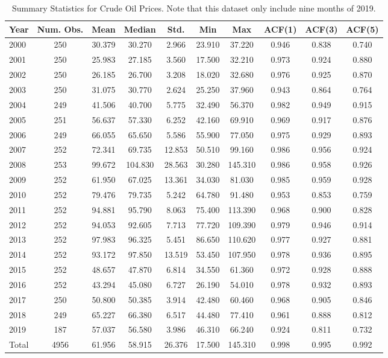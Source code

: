 \documentclass[12pt]{article}
\begin{document}
	\begin{table}[H]
		\small
		\centering
		\begin{tabular}{l|c c c c c c c c c}
			\toprule
			Year & Num. Obs. & Mean & Median & Std. & Min & Max & ACF(1) & ACF(3) & ACF(5) \\
			\midrule
			2000 & 250 & 30.379 & 30.270 & 2.966 & 23.910 & 37.220 & 0.946 & 0.838 & 0.740 \\
			2001 & 250 & 25.983 & 27.185 & 3.560 & 17.500 & 32.210 & 0.973 & 0.924 & 0.880 \\
			2002 & 250 & 26.185 & 26.700 & 3.208 & 18.020 & 32.680 & 0.976 & 0.925 & 0.870 \\
			2003 & 250 & 31.075 & 30.770 & 2.624 & 25.250 & 37.960 & 0.943 & 0.864 & 0.764 \\
			2004 & 249 & 41.506 & 40.700 & 5.775 & 32.490 & 56.370 & 0.982 & 0.949 & 0.915 \\
			2005 & 251 & 56.637 & 57.330 & 6.252 & 42.160 & 69.910 & 0.969 & 0.917 & 0.876 \\
			2006 & 249 & 66.055 & 65.650 & 5.586 & 55.900 & 77.050 & 0.975 & 0.929 & 0.893 \\
			2007 & 252 & 72.341 & 69.735 & 12.853 & 50.510 & 99.160 & 0.986 & 0.956 & 0.924 \\
			2008 & 253 & 99.672 & 104.830 & 28.563 & 30.280 & 145.310 & 0.986 & 0.958 & 0.926 \\
			2009 & 252 & 61.950 & 67.025 & 13.361 & 34.030 & 81.030 & 0.985 & 0.959 & 0.928 \\
			2010 & 252 & 79.476 & 79.735 & 5.242 & 64.780 & 91.480 & 0.953 & 0.853 & 0.759 \\
			2011 & 252 & 94.881 & 95.790 & 8.063 & 75.400 & 113.390 & 0.968 & 0.900 & 0.828 \\
			2012 & 252 & 94.053 & 92.605 & 7.713 & 77.720 & 109.390 & 0.979 & 0.946 & 0.914 \\
			2013 & 252 & 97.983 & 96.325 & 5.451 & 86.650 & 110.620 & 0.977 & 0.927 & 0.881 \\
			2014 & 252 & 93.172 & 97.850 & 13.519 & 53.450 & 107.950 & 0.978 & 0.936 & 0.895 \\
			2015 & 252 & 48.657 & 47.870 & 6.814 & 34.550 & 61.360 & 0.972 & 0.928 & 0.888 \\
			2016 & 252 & 43.294 & 45.080 & 6.727 & 26.190 & 54.010 & 0.978 & 0.932 & 0.893 \\
			2017 & 250 & 50.800 & 50.385 & 3.914 & 42.480 & 60.460 & 0.968 & 0.905 & 0.846 \\
			2018 & 249 & 65.227 & 66.380 & 6.517 & 44.480 & 77.410 & 0.961 & 0.888 & 0.812 \\
			2019 & 187 & 57.037 & 56.580 & 3.986 & 46.310 & 66.240 & 0.924 & 0.811 & 0.732 \\
			\midrule
			Total & 4956 & 61.956 & 58.915 & 26.376 & 17.500 & 145.310 & 0.998 & 0.995 & 0.992 \\
			\bottomrule
		\end{tabular}
		\caption{Summary Statistics for Crude Oil Prices. Note that this dataset only include nine months of 2019.}
	\end{table}
\end{document}
